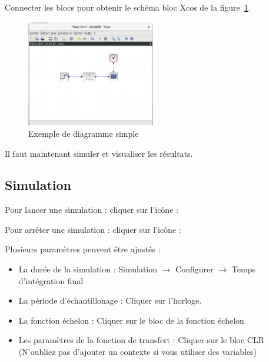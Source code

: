 Connecter les blocs pour obtenir le schéma bloc Xcos de la 
figure~\ref{fig-simple}.

\begin{figure}
    \centering
    \includegraphics[width=0.5\textwidth]{fig/diagramme_simple.eps}
    \caption{Exemple de diagramme simple\label{fig-simple}}
\end{figure}

Il faut maintenant simuler et visualiser les résultats.  

\subsection{Simulation}
Pour lancer une simulation : cliquer sur l'icône : 

Pour arrêter une simulation : cliquer sur l'icône : 

Plusieurs paramètres peuvent être ajustés :
\begin{itemize}
    \item La durée de la simulation : Simulation $\rightarrow$ 
          Configurer $\rightarrow$ Temps d'intégration final
    \item La période d'échantillonage : Cliquer sur l'horloge.
    \item La fonction échelon  : Cliquer sur le bloc de la fonction échelon
    \item Les paramètres de la fonction de transfert : Cliquer sur le bloc CLR 
          (N'oubliez pas d'ajouter un contexte si vous utiliser des variables)
\end{itemize}

